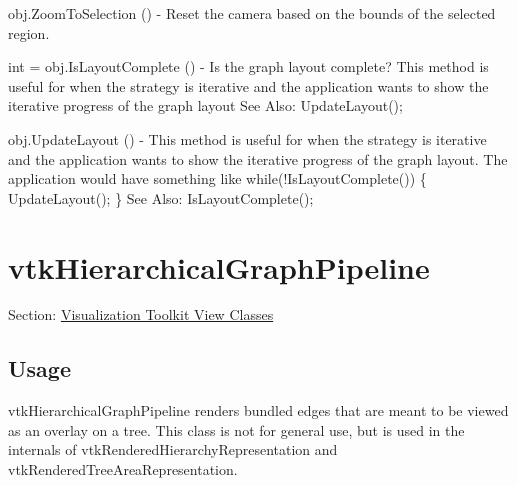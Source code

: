 \begin{DoxyItemize}
\item {\ttfamily obj.\-Zoom\-To\-Selection ()} -\/ Reset the camera based on the bounds of the selected region.  
\item {\ttfamily int = obj.\-Is\-Layout\-Complete ()} -\/ Is the graph layout complete? This method is useful for when the strategy is iterative and the application wants to show the iterative progress of the graph layout See Also\-: Update\-Layout();  
\item {\ttfamily obj.\-Update\-Layout ()} -\/ This method is useful for when the strategy is iterative and the application wants to show the iterative progress of the graph layout. The application would have something like while(!\-Is\-Layout\-Complete()) \{ Update\-Layout(); \} See Also\-: Is\-Layout\-Complete();  
\end{DoxyItemize}\hypertarget{vtkviews_vtkhierarchicalgraphpipeline}{}\section{vtk\-Hierarchical\-Graph\-Pipeline}\label{vtkviews_vtkhierarchicalgraphpipeline}
Section\-: \hyperlink{sec_vtkviews}{Visualization Toolkit View Classes} \hypertarget{vtkwidgets_vtkxyplotwidget_Usage}{}\subsection{Usage}\label{vtkwidgets_vtkxyplotwidget_Usage}
vtk\-Hierarchical\-Graph\-Pipeline renders bundled edges that are meant to be viewed as an overlay on a tree. This class is not for general use, but is used in the internals of vtk\-Rendered\-Hierarchy\-Representation and vtk\-Rendered\-Tree\-Area\-Representation.

